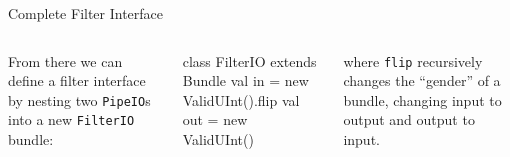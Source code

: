 \documentclass[xcolor=pdflatex,dvipsnames,table]{beamer}
\begin{document}
\begin{frame}[fragile]{Complete Filter Interface}

\begin{columns}

From there we can define a filter interface by nesting two
\verb+PipeIO+s into a new \verb+FilterIO+ bundle:

\begin{scala}
class FilterIO extends Bundle { 
  val in  = new ValidUInt().flip
  val out = new ValidUInt()
}
\end{scala}

\noindent
where \verb+flip+ recursively changes the ``gender'' of a bundle,
changing input to output and output to input.



\end{columns}
\end{frame}
\end{document}
